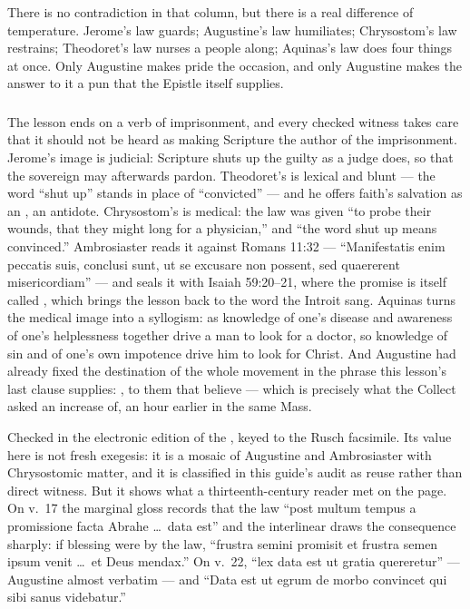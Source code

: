 There is no contradiction in that column, but there is a real difference of
temperature. Jerome's law guards; Augustine's law humiliates; Chrysostom's law
restrains; Theodoret's law nurses a people along; Aquinas's law does four
things at once. Only Augustine makes pride the occasion, and only Augustine
makes the answer to it a pun that the Epistle itself supplies.

\subsubsection*{}

The lesson ends on a verb of imprisonment, and every checked witness takes
care that it should not be heard as making Scripture the author of the
imprisonment. Jerome's image is judicial: Scripture shuts up the guilty as a
judge does, so that the sovereign may afterwards pardon. Theodoret's is
lexical and blunt --- the word ``shut up'' stands in place of ``convicted'' ---
and he offers faith's salvation as an , an antidote.
Chrysostom's is medical: the law was given ``to probe their wounds, that they
might long for a physician,'' and ``the word shut up means convinced.''
Ambrosiaster reads it against Romans 11:32 --- ``Manifestatis enim peccatis
suis, conclusi sunt, ut se excusare non possent, sed quaererent
misericordiam'' --- and seals it with Isaiah 59:20--21, where the promise is
itself called , which brings the lesson back to the word
the Introit sang. Aquinas turns the medical image into a syllogism: as
knowledge of one's disease and awareness of one's helplessness together drive
a man to look for a doctor, so knowledge of sin and of one's own impotence
drive him to look for Christ. And Augustine had already fixed the destination
of the whole movement in the phrase this lesson's last clause supplies:
, to them that believe --- which is precisely what the
Collect asked an increase of, an hour earlier in the same Mass.

\begin{witnessnote}
Checked in the electronic edition of the ,
keyed to the Rusch facsimile. Its value here is not fresh exegesis: it is a
mosaic of Augustine and Ambrosiaster with Chrysostomic matter, and it is
classified in this guide's audit as reuse rather than direct witness. But it
shows what a thirteenth-century reader met on the page. On v.~17 the marginal
gloss records that the law ``post multum tempus a promissione facta Abrahe
\dots\ data est'' and the interlinear draws the consequence sharply: if
blessing were by the law, ``frustra semini promisit et frustra semen ipsum
venit \dots\ et Deus mendax.'' On v.~22, ``lex data est ut gratia quereretur''
--- Augustine almost verbatim --- and ``Data est ut egrum de morbo convincet
qui sibi sanus videbatur.''
\end{witnessnote}

